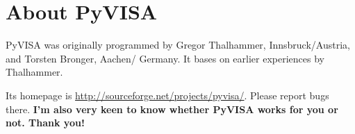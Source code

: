 \documentclass{howto}
\begin{document}
\section{About PyVISA}

PyVISA was originally programmed by Gregor Thalhammer, Innsbruck/Austria, and
Torsten Bronger, Aachen/\hskip0pt Germany.  It bases on earlier experiences by
Thalhammer.

Its homepage is \url{http://sourceforge.net/projects/pyvisa/}.  Please report
bugs there.  \textbf{I'm also very keen to know whether PyVISA works for you or
  not.  Thank you!}  
\end{document}
